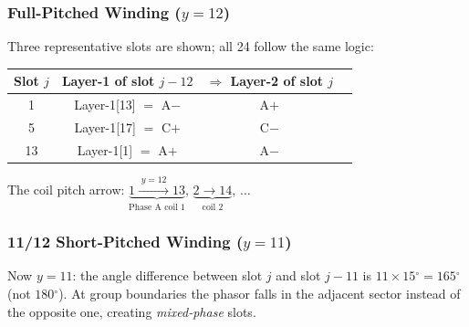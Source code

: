 \documentclass[12pt,a4paper]{article}
\newcommand{\degree}{\ensuremath{^{\circ}}}
\begin{document}
\subsubsection{Full-Pitched Winding ($y = 12$)}

Three representative slots are shown; all 24 follow the same logic:

\begin{center}
\begin{tabular}{cccc}
  \toprule
  Slot $j$ & Layer-1 of slot $j-12$ & $\Rightarrow$ Layer-2 of slot $j$ \\
  \midrule
  1  & Layer-1[13] $=$ A$-$ & A$+$ \\
  5  & Layer-1[17] $=$ C$+$ & C$-$ \\
  13 & Layer-1[1]  $=$ A$+$ & A$-$ \\
  \bottomrule
\end{tabular}
\end{center}

\begin{center}
\end{center}

\noindent The coil pitch arrow: $\underbrace{1 \xrightarrow{\;y=12\;} 13}_{\text{Phase A coil 1}}$,
$\underbrace{2 \xrightarrow{} 14}_{\text{coil 2}}$, $\ldots$

\subsubsection{11/12 Short-Pitched Winding ($y = 11$)}

Now $y = 11$: the angle difference between slot $j$ and slot $j-11$ is
$11 \times 15\degree = 165\degree$ (not $180\degree$).
At group boundaries the phasor falls in the adjacent sector instead of the
opposite one, creating \emph{mixed-phase} slots.
\end{document}
